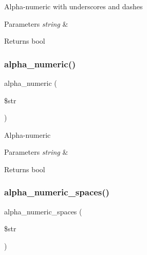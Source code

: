 Alpha-\/numeric with underscores and dashes


\begin{DoxyParams}{Parameters}
{\em string} & \\
\hline
\end{DoxyParams}
\begin{DoxyReturn}{Returns}
bool 
\end{DoxyReturn}
\mbox{\label{class_c_i___form__validation_aa3b561d437be2774b1a6850ada97024a}} 
\subsubsection{\texorpdfstring{alpha\+\_\+numeric()}{alpha\_numeric()}}
{\footnotesize\ttfamily alpha\+\_\+numeric (\begin{DoxyParamCaption}\item[{}]{\$str }\end{DoxyParamCaption})}

Alpha-\/numeric


\begin{DoxyParams}{Parameters}
{\em string} & \\
\hline
\end{DoxyParams}
\begin{DoxyReturn}{Returns}
bool 
\end{DoxyReturn}
\mbox{\label{class_c_i___form__validation_a9c7e61a17f9ff3cbf176d7afab3b1555}} 
\subsubsection{\texorpdfstring{alpha\+\_\+numeric\+\_\+spaces()}{alpha\_numeric\_spaces()}}
{\footnotesize\ttfamily alpha\+\_\+numeric\+\_\+spaces (\begin{DoxyParamCaption}\item[{}]{\$str }\end{DoxyParamCaption})}

